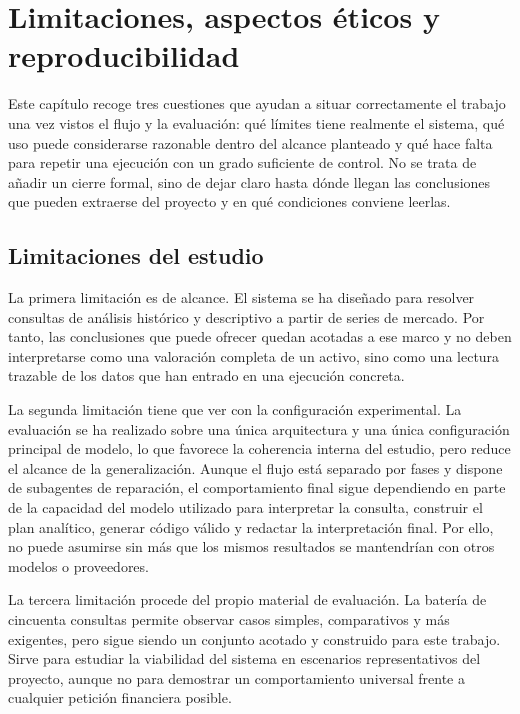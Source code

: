﻿\chapter{Limitaciones, aspectos \'eticos y reproducibilidad}

Este cap\'itulo recoge tres cuestiones que ayudan a situar correctamente el trabajo una vez vistos el flujo y la evaluaci\'on: qu\'e l\'imites tiene realmente el sistema,
qu\'e uso puede considerarse razonable dentro del alcance planteado y qu\'e hace falta para repetir una ejecuci\'on con un grado suficiente de control. No se trata
de a\~nadir un cierre formal, sino de dejar claro hasta d\'onde llegan las conclusiones que pueden extraerse del proyecto y en qu\'e condiciones conviene leerlas.

\section{Limitaciones del estudio}

La primera limitaci\'on es de alcance. El sistema se ha dise\~nado para resolver consultas de an\'alisis hist\'orico y descriptivo a partir de series de mercado. Por tanto,
las conclusiones que puede ofrecer quedan acotadas a ese marco y no deben interpretarse como una valoraci\'on completa de un activo, sino como una lectura trazable de los
datos que han entrado en una ejecuci\'on concreta.

La segunda limitaci\'on tiene que ver con la configuraci\'on experimental. La evaluaci\'on se ha realizado sobre una \'unica arquitectura y una \'unica configuraci\'on principal
de modelo, lo que favorece la coherencia interna del estudio, pero reduce el alcance de la generalizaci\'on. Aunque el flujo est\'a separado por fases y dispone de
subagentes de reparaci\'on, el comportamiento final sigue dependiendo en parte de la capacidad del modelo utilizado para interpretar la consulta, construir el plan anal\'itico,
generar c\'odigo v\'alido y redactar la interpretaci\'on final. Por ello, no puede asumirse sin m\'as que los mismos resultados se mantendr\'ian con otros modelos o proveedores.

La tercera limitaci\'on procede del propio material de evaluaci\'on. La bater\'ia de cincuenta consultas permite observar casos simples, comparativos y m\'as exigentes, pero
sigue siendo un conjunto acotado y construido para este trabajo. Sirve para estudiar la viabilidad del sistema en escenarios representativos del proyecto, aunque no para
demostrar un comportamiento universal frente a cualquier petici\'on financiera posible.

